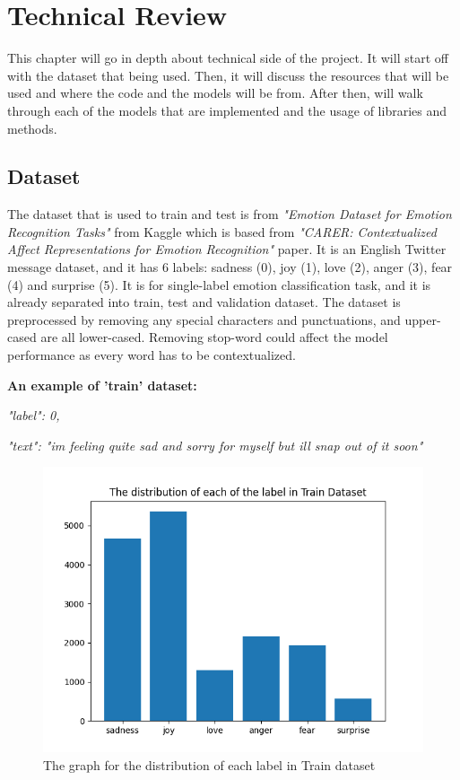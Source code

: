 
\chapter{Technical Review}

This chapter will go in depth about technical side of the project. It will start off with the dataset that being used. Then, it will discuss the resources that will be used and where the code and the models will be from. After then, will walk through each of the models that are implemented and the usage of libraries and methods.

\section{Dataset}
The dataset that is used to train and test is from \textit{"Emotion Dataset for Emotion Recognition Tasks"} \cite{Pandey_2021} from Kaggle which is based from \textit{"CARER: Contextualized Affect Representations for Emotion Recognition"} \cite{saravia-etal-2018-carer} paper. It is an English Twitter message dataset, and it has 6 labels: sadness (0), joy (1), love (2), anger (3), fear (4) and surprise (5). It is for single-label emotion classification task, and it is already separated into train, test and validation dataset. The dataset is preprocessed by removing any special characters and punctuations, and upper-cased are all lower-cased. Removing stop-word could affect the model performance as every word has to be contextualized.

\textbf{An example of 'train' dataset:} 

\emph{"label": 0,}

\textit{"text": "im feeling quite sad and sorry for myself but ill snap out of it soon" }

\begin{figure}[h!]
    \centerline{\includegraphics[scale=0.5]{Figures/dataset_distribution.png}}
    \caption{The graph for the distribution of each label in Train dataset}
    \label{fig:dataset}
\end{figure}

